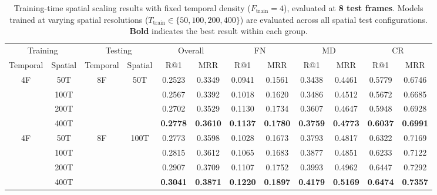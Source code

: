 \begin{table}[t]
\centering
\caption{Training-time spatial scaling results with fixed temporal density ($F_{\text{train}}=4$), evaluated at \textbf{8 test frames}. Models trained at varying spatial resolutions ($T_{\text{train}} \in \{50, 100, 200, 400\}$) are evaluated across all spatial test configurations. \textbf{Bold} indicates the best result within each group.}
\label{mglvr:supp:tab:train_spatial_8f}
\footnotesize
\begin{tabular}{@{}c@{\hspace{3pt}}c@{\hspace{6pt}}c@{\hspace{3pt}}c@{\hspace{6pt}}*{7}{c@{\hspace{3pt}}}c@{}}
\toprule
\multicolumn{2}{c|}{Training} & \multicolumn{2}{c|}{Testing} & \multicolumn{2}{c|}{Overall} & \multicolumn{2}{c|}{FN} & \multicolumn{2}{c|}{MD} & \multicolumn{2}{c}{CR} \\
Temporal & Spatial & Temporal & Spatial & R@1 & MRR & R@1 & MRR & R@1 & MRR & R@1 & MRR \\
\midrule
\multirow{4}{*}{4F} & 50T  & \multirow{4}{*}{8F} & \multirow{4}{*}{50T}  & 0.2523 & 0.3349 & 0.0941 & 0.1561 & 0.3438 & 0.4461 & 0.5779 & 0.6746 \\
                    & 100T &                      &                       & 0.2567 & 0.3392 & 0.1018 & 0.1620 & 0.3486 & 0.4512 & 0.5672 & 0.6685 \\
                    & 200T &                      &                       & 0.2702 & 0.3529 & 0.1130 & 0.1734 & 0.3607 & 0.4647 & 0.5948 & 0.6928 \\
                    & 400T &                      &                       & \textbf{0.2778} & \textbf{0.3610} & \textbf{0.1137} & \textbf{0.1780} & \textbf{0.3759} & \textbf{0.4773} & \textbf{0.6037} & \textbf{0.6991} \\
\midrule
\multirow{4}{*}{4F} & 50T  & \multirow{4}{*}{8F} & \multirow{4}{*}{100T} & 0.2773 & 0.3598 & 0.1028 & 0.1673 & 0.3793 & 0.4817 & 0.6322 & 0.7169 \\
                    & 100T &                      &                       & 0.2815 & 0.3612 & 0.1065 & 0.1683 & 0.3877 & 0.4851 & 0.6233 & 0.7122 \\
                    & 200T &                      &                       & 0.2907 & 0.3709 & 0.1107 & 0.1752 & 0.3993 & 0.4962 & 0.6447 & 0.7292 \\
                    & 400T &                      &                       & \textbf{0.3041} & \textbf{0.3871} & \textbf{0.1220} & \textbf{0.1897} & \textbf{0.4179} & \textbf{0.5169} & \textbf{0.6474} & \textbf{0.7357} \\

\end{tabular}
\end{table}
